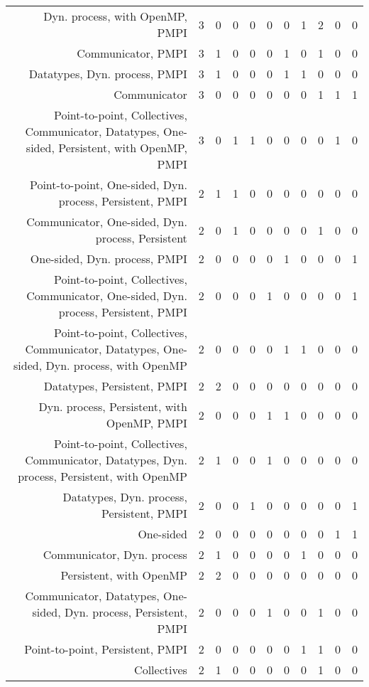 {\begin{landscape}
\begin{longtable}[htb]{r|c|c|c|c|c|c|c|c|c|c}
{Dyn. process, with OpenMP, PMPI} & 3 & 0 & 0 & 0 & 0 & 0 & 1 & 2 & 0 & 0 \\%
{Communicator, PMPI} & 3 & 1 & 0 & 0 & 0 & 1 & 0 & 1 & 0 & 0 \\%
{Datatypes, Dyn. process, PMPI} & 3 & 1 & 0 & 0 & 0 & 1 & 1 & 0 & 0 & 0 \\%
{Communicator} & 3 & 0 & 0 & 0 & 0 & 0 & 0 & 1 & 1 & 1 \\%
{Point-to-point, Collectives, Communicator, Datatypes, One-sided, Persistent, with OpenMP, PMPI} & 3 & 0 & 1 & 1 & 0 & 0 & 0 & 0 & 1 & 0 \\%
{Point-to-point, One-sided, Dyn. process, Persistent, PMPI} & 2 & 1 & 1 & 0 & 0 & 0 & 0 & 0 & 0 & 0 \\%
{Communicator, One-sided, Dyn. process, Persistent} & 2 & 0 & 1 & 0 & 0 & 0 & 0 & 1 & 0 & 0 \\%
{One-sided, Dyn. process, PMPI} & 2 & 0 & 0 & 0 & 0 & 1 & 0 & 0 & 0 & 1 \\%
{Point-to-point, Collectives, Communicator, One-sided, Dyn. process, Persistent, PMPI} & 2 & 0 & 0 & 0 & 1 & 0 & 0 & 0 & 0 & 1 \\%
{Point-to-point, Collectives, Communicator, Datatypes, One-sided, Dyn. process, with OpenMP} & 2 & 0 & 0 & 0 & 0 & 1 & 1 & 0 & 0 & 0 \\%
{Datatypes, Persistent, PMPI} & 2 & 2 & 0 & 0 & 0 & 0 & 0 & 0 & 0 & 0 \\%
{Dyn. process, Persistent, with OpenMP, PMPI} & 2 & 0 & 0 & 0 & 1 & 1 & 0 & 0 & 0 & 0 \\%
{Point-to-point, Collectives, Communicator, Datatypes, Dyn. process, Persistent, with OpenMP} & 2 & 1 & 0 & 0 & 1 & 0 & 0 & 0 & 0 & 0 \\%
{Datatypes, Dyn. process, Persistent, PMPI} & 2 & 0 & 0 & 1 & 0 & 0 & 0 & 0 & 0 & 1 \\%
{One-sided} & 2 & 0 & 0 & 0 & 0 & 0 & 0 & 0 & 1 & 1 \\%
{Communicator, Dyn. process} & 2 & 1 & 0 & 0 & 0 & 0 & 1 & 0 & 0 & 0 \\%
{Persistent, with OpenMP} & 2 & 2 & 0 & 0 & 0 & 0 & 0 & 0 & 0 & 0 \\%
{Communicator, Datatypes, One-sided, Dyn. process, Persistent, PMPI} & 2 & 0 & 0 & 0 & 1 & 0 & 0 & 1 & 0 & 0 \\%
{Point-to-point, Persistent, PMPI} & 2 & 0 & 0 & 0 & 0 & 0 & 1 & 1 & 0 & 0 \\%
{Collectives} & 2 & 1 & 0 & 0 & 0 & 0 & 0 & 1 & 0 & 0 \\%

\end{longtable}
\end{landscape}}
